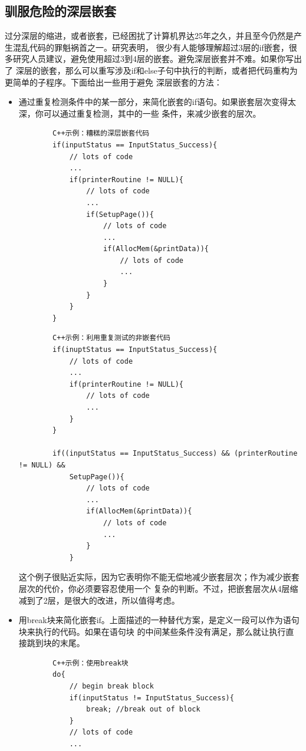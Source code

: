 \documentclass{article}
\begin{document}
\subsection{驯服危险的深层嵌套}
过分深层的缩进，或者嵌套，已经困扰了计算机界达25年之久，并且至今仍然是产生混乱代码的罪魁祸首之一。研究表明，
很少有人能够理解超过3层的if嵌套，很多研究人员建议，避免使用超过3到4层的嵌套。避免深层嵌套并不难。如果你写出了
深层的嵌套，那么可以重写涉及if和else子句中执行的判断，或者把代码重构为更简单的子程序。下面给出一些用于避免
深层嵌套的方法：
\begin{itemize}
    \item 通过重复检测条件中的某一部分，来简化嵌套的if语句。如果嵌套层次变得太深，你可以通过重复检测，其中的一些
    条件，来减少嵌套的层次。
    \begin{lstlisting}
        C++示例：糟糕的深层嵌套代码
        if(inputStatus == InputStatus_Success){
            // lots of code
            ...
            if(printerRoutine != NULL){
                // lots of code
                ...
                if(SetupPage()){
                    // lots of code
                    ...
                    if(AllocMem(&printData)){
                        // lots of code
                        ...
                    }
                }
            }
        }
    \end{lstlisting}
    \begin{lstlisting}
        C++示例：利用重复测试的非嵌套代码
        if(inuptStatus == InputStatus_Success){
            // lots of code
            ...
            if(printerRoutine != NULL){
                // lots of code
                ...
            }
        }

        if((inputStatus == InputStatus_Success) && (printerRoutine != NULL) &&
            SetupPage()){
                // lots of code
                ...
                if(AllocMem(&printData)){
                    // lots of code
                    ...
                }
            }
    \end{lstlisting}
    这个例子很贴近实际，因为它表明你不能无偿地减少嵌套层次；作为减少嵌套层次的代价，你必须要容忍使用一个
    复杂的判断。不过，把嵌套层次从4层缩减到了2层，是很大的改进，所以值得考虑。
    \item 用break块来简化嵌套if。上面描述的一种替代方案，是定义一段可以作为语句块来执行的代码。如果在语句块
    的中间某些条件没有满足，那么就让执行直接跳到块的末尾。
    \begin{lstlisting}
        C++示例：使用break块
        do{
            // begin break block
            if(inputStatus != InputStatus_Success){
                break; //break out of block
            }
            // lots of code
            ...


\end{lstlisting}
\end{itemize}
\end{document}
